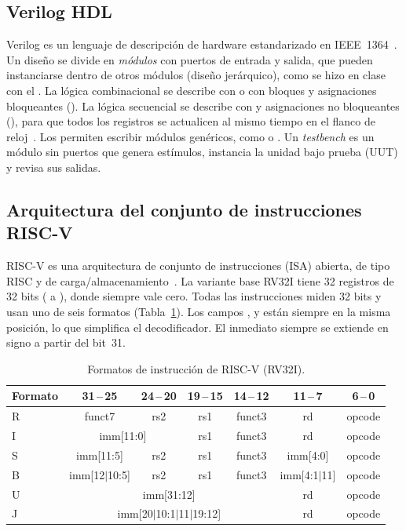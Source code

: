 \documentclass[12pt,letterpaper]{article}
\begin{document}
\subsection{Verilog HDL}
Verilog es un lenguaje de descripción de hardware estandarizado en IEEE~1364~\cite{ieee1364}.
Un diseño se divide en \emph{módulos} con puertos de entrada y salida, que pueden instanciarse
dentro de otros módulos (diseño jerárquico), como se hizo en clase con el
. La lógica combinacional se describe con  o con
bloques  y asignaciones bloqueantes (\cod{=}). La lógica secuencial se describe
con  y asignaciones no bloqueantes (\cod{<=}), para que todos los
registros se actualicen al mismo tiempo en el flanco de reloj~\cite{cummings}. Los
 permiten escribir módulos genéricos, como  o . Un
\emph{testbench} es un módulo sin puertos que genera estímulos, instancia la unidad bajo prueba
(UUT) y revisa sus salidas.

\subsection{Arquitectura del conjunto de instrucciones RISC-V}
RISC-V es una arquitectura de conjunto de instrucciones (ISA) abierta, de tipo RISC y de
carga/almacenamiento~\cite{riscvspec}. La variante base RV32I tiene 32 registros de 32 bits
( a ), donde  siempre vale cero. Todas las instrucciones miden 32 bits
y usan uno de seis formatos (Tabla~\ref{tab:formatos}). Los campos ,  y
 están siempre en la misma posición, lo que simplifica el decodificador. El inmediato
siempre se extiende en signo a partir del bit~31.

\begin{table}[H]
  \centering
  \caption{Formatos de instrucción de RISC-V (RV32I).}
  \label{tab:formatos}
  \small
  \begin{tabular}{lcccccc}
    \toprule
    Formato & 31\,--\,25 & 24\,--\,20 & 19\,--\,15 & 14\,--\,12 & 11\,--\,7 & 6\,--\,0 \\
    \midrule
    R & funct7 & rs2 & rs1 & funct3 & rd & opcode \\
    I & \multicolumn{2}{c}{imm[11:0]} & rs1 & funct3 & rd & opcode \\
    S & imm[11:5] & rs2 & rs1 & funct3 & imm[4:0] & opcode \\
    B & imm[12$|$10:5] & rs2 & rs1 & funct3 & imm[4:1$|$11] & opcode \\
    U & \multicolumn{4}{c}{imm[31:12]} & rd & opcode \\
    J & \multicolumn{4}{c}{imm[20$|$10:1$|$11$|$19:12]} & rd & opcode \\
    \bottomrule
  \end{tabular}
\end{table}
\end{document}
